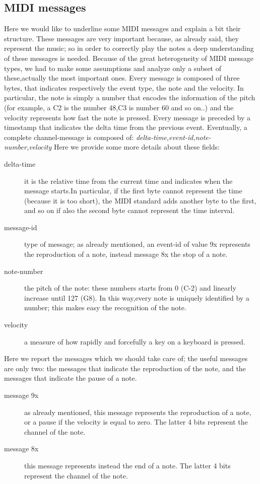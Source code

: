 \documentclass[12pt]{article}
\begin{document}
\subsection{MIDI messages}
Here we would like to underline some MIDI messages and explain a bit their structure. These messages are very important because, as already said, they represent the music; so in order to correctly play the notes a deep understanding of these messages is needed.\newline
Because of the great heterogeneity of MIDI message types, we had to make some assumptions and analyze only a subset of these,actually the most important ones. Every message is composed of three bytes, that indicates respectively the event type, the note and the velocity. In particular, the note is simply a number that encodes the information of the pitch (for example, a C2 is the number 48,C3 is number 60 and so on..) and the velocity represents how fast the note is pressed. 
Every message is preceded by a timestamp that indicates the delta time from the previous event.\newline
Eventually, a complete channel-message is composed of: \newline
\emph{delta-time,event-id,note-number,velocity} \newline
Here we provide some more details about these fields:\newline
\begin{description}
	\item[delta-time] it is the relative time from the current time and indicates when the message starts.In particular, if the first byte cannot represent the time (because it is too short), the MIDI standard adds another byte to the first, and so on if also the second byte cannot represent the time interval.
	\item[message-id] type of message; as already mentioned, an event-id of value 9x represents the reproduction of a note, instead message 8x the stop of a note.
	\item[note-number] the pitch of the note: these numbers starts from 0 (C-2) and linearly increase until 127 (G8). In this way,every note is uniquely identified by a number; this makes easy the recognition of the note.
	\item[velocity] a measure of how rapidly and forcefully a key on a keyboard is pressed.
\end{description}
Here we report the messages which we should take care of; the useful messages are only two: the messages that indicate the reproduction of the note, and the messages that indicate the pause of a note.
\begin{description} 
	\item[message 9x]  as already mentioned, this message represents the reproduction of a note, or a pause if the velocity is equal to zero. The latter 4 bits represent the channel of the note.
	\item[message 8x] this message represents instead the end of a note. The latter 4 bits represent the channel of the note.
\end{description}
\end{document}
